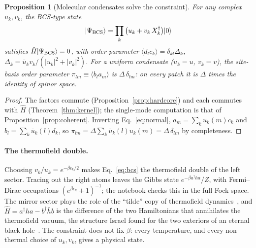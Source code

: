 \documentclass[reprint,aps,prd,amsmath,amssymb,superscriptaddress,nofootinbib,floatfix]{revtex4-2}
\theoremstyle{plain}
\newtheorem{proposition}{Proposition}
\theoremstyle{definition}
\theoremstyle{remark}
\newcommand{\Mol}{\ensuremath{X}}                 %
\newcommand{\ket}[1]{\ensuremath{|#1\rangle}}
\newcommand{\Hc}{\hat{H}}
\begin{document}
\begin{proposition}[Molecular condensates solve the constraint]
\label{prop:condensate}
For any complex $u_k,v_k$, the BCS-type state
\begin{equation}
\ket{\Psi_{\rm BCS}}=\prod_k\big(u_k+v_k\,\Mol^\dagger_k\big)\ket0
\label{eq:bcs}
\end{equation}
satisfies $\Hc\ket{\Psi_{\rm BCS}}=0$, with order parameter $\langle d_lc_k\rangle=\delta_{kl}\Delta_k$, $\Delta_k=\bar u_kv_k/(|u_k|^2+|v_k|^2)$. For a
uniform condensate ($u_k=u$, $v_k=v$), the site-basis order parameter $\pi_{lm}\equiv\langle b_la_m\rangle$ is $\Delta\,\delta_{lm}$: on every patch
it is $\Delta$ times the identity of spinor space.
\end{proposition}
\begin{proof}
The factors commute (Proposition~\ref{prop:hardcore}) and each commutes with $\Hc$ (Theorem~\ref{thm:kernel}); the single-mode
computation is that of Proposition~\ref{prop:coherent}. Inverting Eq.~\eqref{eq:normal}, $a_m=\sum_ku_k(m)c_k$ and
$b_l=\sum_k\bar u_k(l)d_k$, so $\pi_{lm}=\Delta\sum_k\bar u_k(l)u_k(m)=\Delta\,\delta_{lm}$ by completeness.
\end{proof}
\paragraph*{The thermofield double.} Choosing $v_k/u_k=e^{-\beta\epsilon_k/2}$ makes Eq.~\eqref{eq:bcs} the thermofield double of the
left sector. Tracing out the right atoms leaves the Gibbs state $e^{-\beta a^\dagger ha}/Z$, with Fermi--Dirac occupations
$(e^{\beta\epsilon_k}+1)^{-1}$; the notebook checks this in the full Fock space. The mirror sector plays the role of the ``tilde''
copy of thermofield dynamics~\cite{TakahashiUmezawa1975}, and $\Hc=a^\dagger ha-b^\dagger\bar hb$ is the difference of the two
Hamiltonians that annihilates the thermofield vacuum, the structure Israel found for the two exteriors of an eternal black
hole~\cite{Israel1976}. The constraint does not fix $\beta$: every temperature, and every non-thermal choice of $u_k,v_k$,
gives a physical state.
\end{document}
